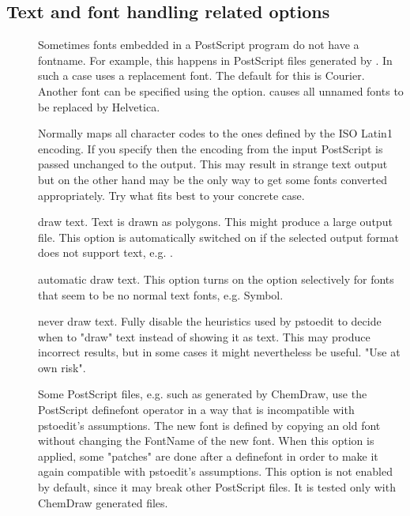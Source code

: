 \documentclass[english,a4paper]{article}
\begin{document}
\subsection{Text and font handling related options}
\begin{description}
\item[]
 Sometimes fonts embedded in a PostScript program do not have a fontname. For example, this happens in PostScript files generated by . In such a case  uses a replacement font. The default for this is Courier. Another font can be specified using the  option.  causes all unnamed fonts to be replaced by Helvetica.


\item[]
Normally  maps all character codes to the ones defined by the ISO Latin1 encoding. If you specify  then the encoding from the input PostScript is passed unchanged to the output. This may result in strange text output but on the other hand may be the only way to get some fonts converted appropriately. Try what fits best to your concrete case.


\item[]



\item[]
draw text. Text is drawn as polygons. This might produce a large output file. This option is automatically switched on if the selected output format does not support text, e.g. .


\item[]
automatic draw text. This option turns on the  option selectively for fonts that seem to be no normal text fonts, e.g. Symbol.


\item[]
never draw text. Fully disable the heuristics used by pstoedit to decide when to "draw" text instead of showing it as text. This may produce incorrect results, but in some cases it might nevertheless be useful. "Use at own risk".


\item[]



\item[]
Some PostScript files, e.g. such as generated by ChemDraw, use the PostScript definefont operator in a way that is incompatible with pstoedit's assumptions. The new font is defined by copying an old font without changing the FontName of the new font. When this option is applied, some "patches" are done after a definefont in order to make it again compatible with pstoedit's assumptions. This option is not enabled by default, since it may break other PostScript files. It is tested only with ChemDraw generated files.



\end{description}
\end{document}
